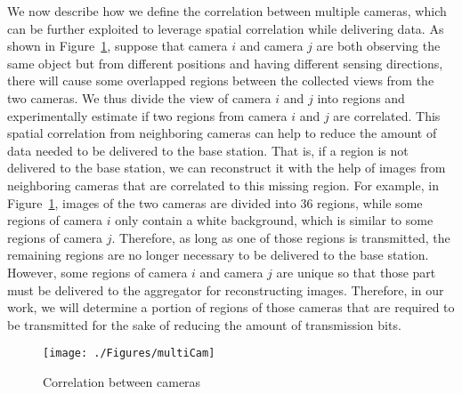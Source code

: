 We now describe how we define the correlation between multiple cameras, which can be further exploited to leverage spatial correlation while delivering data.
As shown in Figure~\ref{fig::multiCam}, suppose that camera $i$ and camera $j$ are both observing the same object but from different positions and having different sensing directions, there will cause some overlapped regions between the collected views from the two cameras.
We thus divide the view of camera $i$ and $j$ into regions and experimentally estimate if two regions from camera $i$ and $j$ are correlated.
This spatial correlation from neighboring cameras can help to reduce the amount of data needed to be delivered to the base station.
That is, if a region is not delivered to the base station, we can reconstruct it with the help of images from neighboring cameras that are correlated to this missing region.
%
For example, in Figure~\ref{fig::multiCam}, images of the two cameras are divided into $36$ regions, while some regions of camera $i$ only contain a white background, which is similar to some regions of camera $j$.
Therefore, as long as one of those regions is transmitted, the remaining regions are no longer necessary to be delivered to the base station.
However, some regions of camera $i$ and camera $j$ are unique so that those part must be delivered to the aggregator for reconstructing images.
Therefore, in our work, we will determine a portion of regions of those cameras that are required to be transmitted for the sake of reducing the amount of transmission bits.
%
\begin{figure}
\begin{center}
\texttt{[image: ./Figures/multiCam]}
\caption{\label{fig::multiCam}Correlation between cameras}
\end{center}
\end{figure}
%
